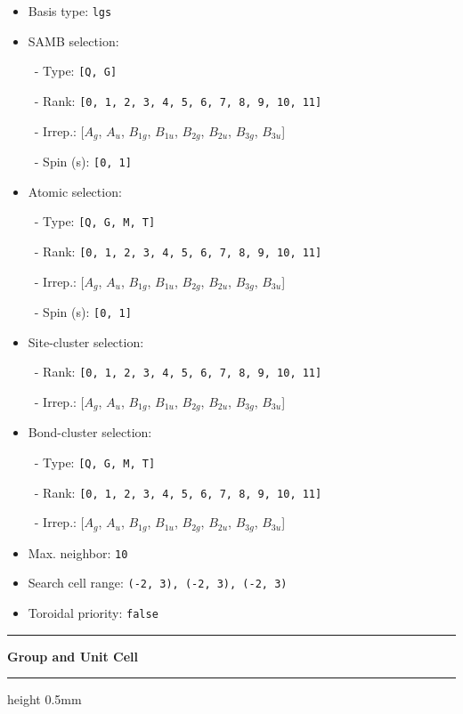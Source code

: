 \documentclass[fleqn,10pt,landscape]{jsarticle}
\begin{document}
\begin{itemize}
\item Basis type: \texttt{lgs}

\item SAMB selection:

\, - Type: \texttt{[Q, G]}

\, - Rank: \texttt{[0, 1, 2, 3, 4, 5, 6, 7, 8, 9, 10, 11]}

\, - Irrep.: [$A_{g}$, $A_{u}$, $B_{1g}$, $B_{1u}$, $B_{2g}$, $B_{2u}$, $B_{3g}$, $B_{3u}$]

\, - Spin (s): \texttt{[0, 1]}

\item Atomic selection:

\, - Type: \texttt{[Q, G, M, T]}

\, - Rank: \texttt{[0, 1, 2, 3, 4, 5, 6, 7, 8, 9, 10, 11]}

\, - Irrep.: [$A_{g}$, $A_{u}$, $B_{1g}$, $B_{1u}$, $B_{2g}$, $B_{2u}$, $B_{3g}$, $B_{3u}$]

\, - Spin (s): \texttt{[0, 1]}

\item Site-cluster selection:

\, - Rank: \texttt{[0, 1, 2, 3, 4, 5, 6, 7, 8, 9, 10, 11]}

\, - Irrep.: [$A_{g}$, $A_{u}$, $B_{1g}$, $B_{1u}$, $B_{2g}$, $B_{2u}$, $B_{3g}$, $B_{3u}$]

\item Bond-cluster selection:

\, - Type: \texttt{[Q, G, M, T]}

\, - Rank: \texttt{[0, 1, 2, 3, 4, 5, 6, 7, 8, 9, 10, 11]}

\, - Irrep.: [$A_{g}$, $A_{u}$, $B_{1g}$, $B_{1u}$, $B_{2g}$, $B_{2u}$, $B_{3g}$, $B_{3u}$]

\item Max. neighbor: \texttt{10}

\item Search cell range: \texttt{(-2, 3), (-2, 3), (-2, 3)}

\item Toroidal priority: \texttt{false}

\end{itemize}
\vspace{5mm}
\noindent \rule[0.5mm]{5mm}{0.5mm}\hspace{3mm}\textbf{Group and Unit Cell}\hspace{3mm}\leaders\hrule height 0.5mm\hfill\kern0pt
\vspace{3mm}
\end{document}
